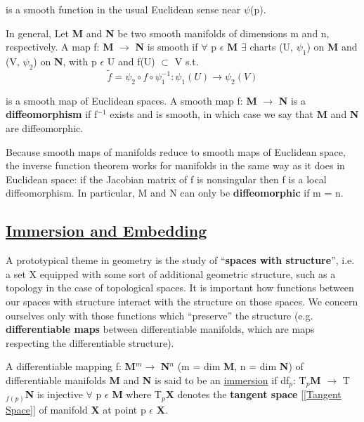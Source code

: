 is a smooth function in the usual Euclidean sense near $\psi$(p).

In general, Let \textbf{M} and \textbf{N} be two smooth manifolds of dimensions m and n, respectively. 
A map f: \textbf{M} $\rightarrow$ \textbf{N} is smooth if $\forall$ p $\epsilon$ \textbf{M} $\exists$ charts (U, $\psi_1$) on \textbf{M} and (V, $\psi_2$) on \textbf{N}, 
with p $\epsilon$ U and f(U) $\subset$ V s.t.
\begin{equation}
    \widetilde{f}= \psi_2 \circ f \circ \psi_1^{-1}:\psi_1(U) \rightarrow \psi_2(V)
\end{equation}

is a smooth map of Euclidean spaces. A smooth map f: \textbf{M} $\rightarrow$ \textbf{N} is a \textbf{diffeomorphism} 
if f$^{-1}$ exists and is smooth, in which case we say that \textbf{M} and \textbf{N} are diffeomorphic.

Because smooth maps of manifolds reduce to smooth maps of Euclidean space, 
the inverse function theorem works for manifolds in the same way as it does in Euclidean space: 
if the Jacobian matrix of f is nonsingular then f is a local diffeomorphism. 
In particular, M and N can only be \textbf{diffeomorphic} if m = n.

\subsection{\href{https://mathweb.ucsd.edu/~eizadi/250A-2019/Patrick-Girardet.pdf}{Immersion and Embedding}}
A prototypical theme in geometry is the study of “\textbf{spaces with structure}”, i.e.
a set X equipped with some sort of additional geometric structure, such as a
topology in the case of topological spaces. It is important how
functions between our spaces with structure interact with the structure on those
spaces. We concern ourselves only with those functions which “preserve” the
structure (e.g. \textbf{differentiable maps} between {differentiable manifolds}, 
which are maps respecting the differentiable structure).

A differentiable mapping f: \textbf{M}$^m \rightarrow$ \textbf{N}$^n$ (m = dim \textbf{M}, n = dim \textbf{N})
of differentiable manifolds \textbf{M} and \textbf{N} is said to be an \href{https://en.wikipedia.org/wiki/Immersion_(mathematics)}{immersion}
if df$_p$: T$_p$\textbf{M} $\rightarrow$ T$_{f(p)}$\textbf{N} is injective $\forall$ p $\epsilon$ \textbf{M} where
T$_p$\textbf{X} denotes the \textbf{tangent space} [\ref{Tangent Space}] of manifold \textbf{X} at point p $\epsilon$ \textbf{X}.

